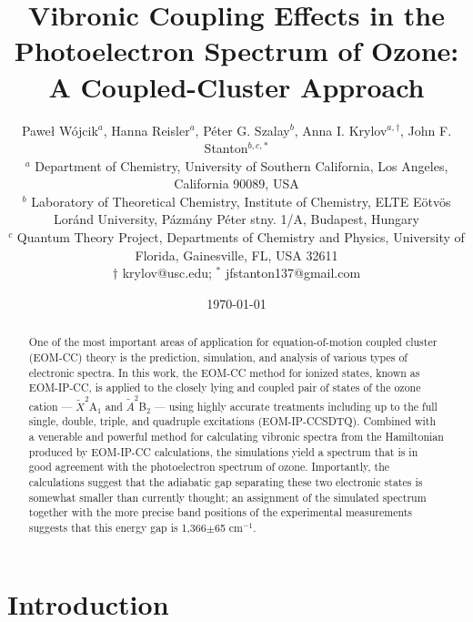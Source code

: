 \documentclass[12pt,prb,aps]{revtex4}
\begin{document}
\title{Vibronic Coupling Effects in the Photoelectron Spectrum of Ozone: A
Coupled-Cluster Approach}

\author{Pawe{\l} W{\'o}jcik$^a$,  Hanna Reisler$^a$, P{\'e}ter G. Szalay$^b$, Anna I. Krylov$^{a,\dagger}$, John F. Stanton$^{b,c,*}$\\
{\small $^a$ Department of Chemistry, University of Southern California, Los Angeles, California 90089, USA}\\
{\small $^b$  Laboratory of Theoretical Chemistry, Institute of Chemistry, ELTE
E{\"o}tv{\"o}s Lor{\'a}nd University, P{\'a}zm{\'a}ny P{\'e}ter stny. 1/A,
Budapest, Hungary}\\
{\small $^c$ Quantum Theory Project, Departments of Chemistry and Physics, University of Florida, Gainesville, FL, USA 32611}\\
{$\dagger$ krylov@usc.edu; $^*$ jfstanton137@gmail.com}}


\date{\today}

\begin{abstract}
One of the most important areas of application for equation-of-motion coupled
cluster (EOM-CC) theory is the prediction, simulation, and analysis of
various types of electronic spectra. 
In this work, the EOM-CC method for ionized states, known
as EOM-IP-CC, is applied to the closely lying and coupled pair of states of the
ozone cation --- ${\tilde X}^2$A$_1$ and ${\tilde A}^2$B$_2$ --- using highly accurate 
treatments including up to the full single, double, triple, and quadruple excitations
(EOM-IP-CCSDTQ). Combined with a venerable and powerful method for
calculating vibronic spectra from the Hamiltonian produced by EOM-IP-CC
calculations, the simulations yield a spectrum that is in good agreement with
the photoelectron spectrum of ozone. Importantly,  the
calculations suggest that the adiabatic gap separating these two electronic
states is somewhat smaller than currently thought; an assignment of the
simulated spectrum together with the more precise band positions of the
experimental measurements suggests that this energy gap is 1,366$\pm$65
cm$^{-1}$.
\end{abstract}

\maketitle

\section{Introduction}
\end{document}
